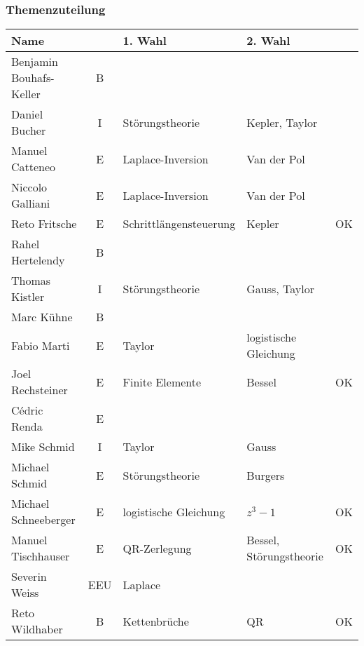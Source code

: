 \documentclass[handout]{beamer}
\title[]{}
\begin{document}
\begin{frame}
\frametitle{Themenzuteilung}
\begin{center}
\renewcommand\arraystretch{1.25}
\begin{tabular}{|p{6cm}|c|p{6cm}|p{6cm}|c|}
\hline
Name&&1. Wahl&2. Wahl&\\
\hline
\hline
Benjamin Bouhafs-Keller  &B  &&&\\
\hline
Daniel Bucher            &I  &Störungstheorie&Kepler, Taylor&\\
\hline
Manuel Catteneo          &E  &Laplace-Inversion&Van der Pol&\\
Niccolo Galliani         &E  &Laplace-Inversion&Van der Pol&\\
\hline
Reto Fritsche            &E  &Schrittlängensteuerung&{\tiny Kepler}&OK\\
\hline
Rahel Hertelendy         &B  &&&\\
\hline
Thomas Kistler           &I  &Störungstheorie&Gauss, Taylor&\\
\hline
Marc Kühne               &B  &&&\\
\hline
Fabio Marti              &E  &Taylor&logistische Gleichung&\\
\hline
Joel Rechsteiner         &E  &Finite Elemente&{\tiny Bessel}&OK\\
\hline
Cédric Renda             &E  &&&\\
\hline
Mike Schmid              &I  &Taylor&Gauss&\\
\hline
Michael Schmid           &E  &Störungstheorie&Burgers&\\
\hline
Michael Schneeberger     &E  &logistische Gleichung&{\tiny $z^3-1$}&OK\\
\hline
Manuel Tischhauser       &E  &QR-Zerlegung&{\tiny Bessel, Störungstheorie}&OK\\
\hline
Severin Weiss            &EEU&Laplace&&\\
\hline
Reto Wildhaber           &B  &Kettenbrüche&{\tiny QR}&OK\\
\hline
\end{tabular}
\end{center}
\end{frame}
\end{document}
